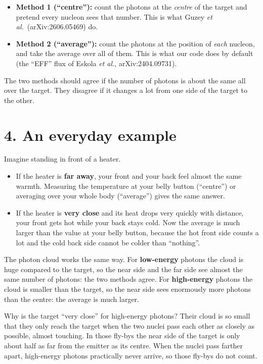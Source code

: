 \documentclass[12pt]{article}
\begin{document}
\begin{itemize}
\item \textbf{Method 1 (``centre''):} count the photons at the \emph{centre} of the target and
  pretend every nucleon sees that number. This is what Guzey \textit{et al.}\ (arXiv:2606.05469)
  do.
\item \textbf{Method 2 (``average''):} count the photons at the position of \emph{each}
  nucleon, and take the average over all of them. This is what our code does by default
  (the ``EFF'' flux of Eskola \textit{et al.}, arXiv:2404.09731).
\end{itemize}

The two methods should agree if the number of photons is about the same all over the target.
They disagree if it changes a lot from one side of the target to the other.

\section*{4. An everyday example}

Imagine standing in front of a heater.
\begin{itemize}
\item If the heater is \textbf{far away}, your front and your back feel almost the same warmth.
  Measuring the temperature at your belly button (``centre'') or averaging over your whole body
  (``average'') gives the same answer.
\item If the heater is \textbf{very close} and its heat drops very quickly with distance, your
  front gets hot while your back stays cold. Now the average is much larger than the value at
  your belly button, because the hot front side counts a lot and the cold back side cannot be
  colder than ``nothing''.
\end{itemize}

The photon cloud works the same way. For \textbf{low-energy} photons the cloud is huge compared
to the target, so the near side and the far side see almost the same number of photons: the two
methods agree. For \textbf{high-energy} photons the cloud is smaller than the target, so the near
side sees enormously more photons than the centre: the average is much larger.

Why is the target ``very close'' for high-energy photons? Their cloud is so small that they only
reach the target when the two nuclei pass each other as closely as possible, almost touching.
In those fly-bys the near side of the target is only about half as far from the emitter as its
centre. When the nuclei pass farther apart, high-energy photons practically never arrive, so
those fly-bys do not count.
\end{document}
